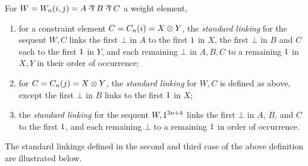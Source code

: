 \documentclass[conference]{IEEEtran}
\begin{document}
                                                                                                                                                                                                                                                                                                                                                                                                                                                                                  
\begin{definition}
\label{def:standard linkings}
For $W=W_n(i,j)=A\parr B\parr C$ a weight element,
\begin{enumerate}
	\item
for a constraint element $C=C_n(i)=X\otimes Y$, the \emph{standard linking} for the sequent $W,C$ links the first $\bot$ in $A$ to the first $1$ in $X$, the first $\bot$ in $B$ and $C$ each to the first $1$ in $Y$, and each remaining $\bot$ in $A,B,C$ to a remaining $1$ in $X,Y$ in their order of occurrence;
	\item
for $C=C_n(j)=X\otimes Y$, the \emph{standard linking} for $W,C$ is defined as above, except the first $\bot$ in $B$ links to the first $1$ in $X$;
	\item
the \emph{standard linking} for the sequent $W,1^{3n+4}$ links the first $\bot$ in $A$, $B$, and $C$ to the first $1$, and each remaining $\bot$ to a remaining $1$ in order of occurrence.
\end{enumerate}
\end{definition}

The standard linkings defined in the \color{red} second \color{black} and third case of the above definition are illustrated below.
\end{document}
